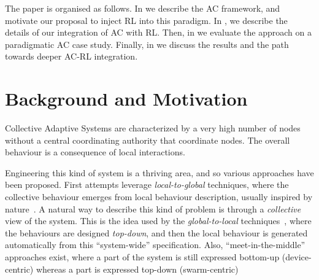 \documentclass[conference]{IEEEtran}
\begin{document}
The paper is organised as follows. 
%
In  we describe
 the AC framework, %
 and motivate our proposal to inject RL into this paradigm. 
 In , we describe the details of our integration of AC with RL.
Then, in   we evaluate the approach on a paradigmatic AC case study.
%
Finally, in  we discuss the results and the path towards deeper AC-RL integration.

 \section{Background and Motivation}\label{background}


Collective Adaptive Systems are characterized by a very high number of nodes without a central coordinating authority that coordinate nodes. 
 The overall behaviour is a consequence of local interactions.%
 
Engineering this kind of system is a thriving area, and so various approaches have been proposed.
 First attempts leverage \textit{local-to-global} techniques, where the collective behaviour emerges from local behaviour description, 
 usually inspired by nature~\cite{DBLP:journals/swarm/BrambillaFBD13}. 
%
A natural way to describe this kind of problem is through a \textit{collective} view of the system.
 This is the idea used by the \textit{global-to-local} techniques~\cite{DBLP:journals/jlap/ViroliBDACP19,DBLP:journals/scp/AlrahmanNL20, DBLP:conf/cbse/BuresGHKKP13}, 
 where the behaviours are designed \textit{top-down}, and then the local behaviour is generated automatically from this ``system-wide'' specification. 
% 
Also, ``meet-in-the-middle''~\cite{DBLP:journals/computer/PinciroliB16} approaches exist, where
 a part of the system is still expressed bottom-up (device-centric) whereas a part is expressed top-down (swarm-centric)
\end{document}
